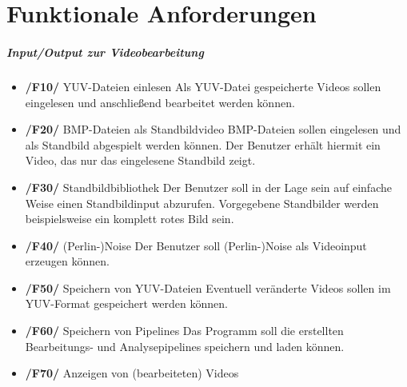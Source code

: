 \section{Funktionale Anforderungen}

\subparagraph{Input/Output zur Videobearbeitung}
 
\begin{itemize}
        \item \textbf{/F10/} YUV-Dateien einlesen \newline
                Als YUV-Datei gespeicherte Videos sollen eingelesen und anschließend bearbeitet werden können.
        \item \textbf{/F20/} BMP-Dateien als Standbildvideo\newline
                BMP-Dateien sollen eingelesen und als Standbild abgespielt werden können. Der Benutzer erhält hiermit ein Video, das nur das eingelesene Standbild zeigt.
        \item \textbf{/F30/} Standbildbibliothek \newline
                Der Benutzer soll in der Lage sein auf einfache Weise einen Standbildinput abzurufen. Vorgegebene                Standbilder werden beispielsweise ein komplett rotes Bild sein.
        \item \textbf{/F40/} (Perlin-)Noise \newline
                Der Benutzer soll (Perlin-)Noise als Videoinput erzeugen können.
        \item \textbf{/F50/} Speichern von YUV-Dateien \newline
                Eventuell veränderte Videos sollen im YUV-Format gespeichert werden können.
        \item \textbf{/F60/} Speichern von Pipelines \newline
                Das Programm soll die erstellten Bearbeitungs- und Analysepipelines speichern und laden können.
        \item \textbf{/F70/} Anzeigen von (bearbeiteten) Videos
\end{itemize}
 
